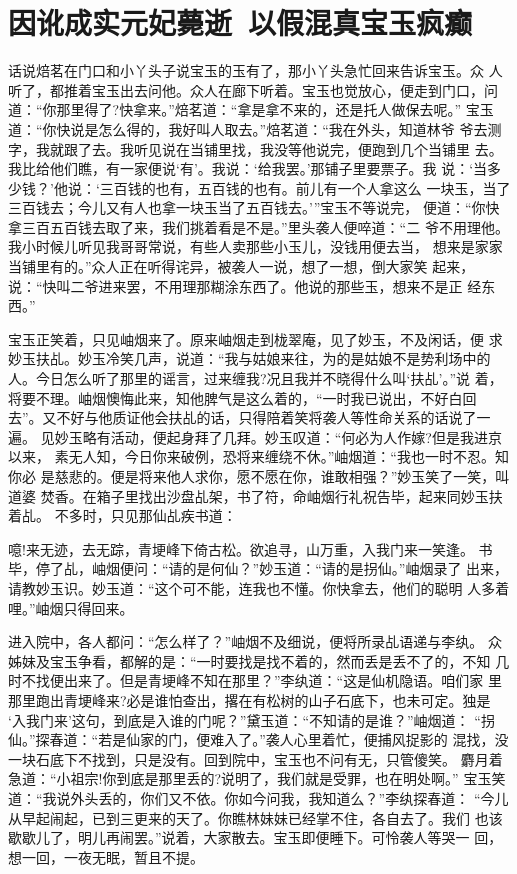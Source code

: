 \chapter{因讹成实元妃薨逝~以假混真宝玉疯癫}

话说焙茗在门口和小丫头子说宝玉的玉有了，那小丫头急忙回来告诉宝玉。众
人听了，都推着宝玉出去问他。众人在廊下听着。宝玉也觉放心，便走到门口，问
道：“你那里得了?快拿来。”焙茗道：“拿是拿不来的，还是托人做保去呢。”
宝玉道：“你快说是怎么得的，我好叫人取去。”焙茗道：“我在外头，知道林爷
爷去测字，我就跟了去。我听见说在当铺里找，我没等他说完，便跑到几个当铺里
去。我比给他们瞧，有一家便说‘有’。我说：‘给我罢。’那铺子里要票子。我
说：‘当多少钱？’他说：‘三百钱的也有，五百钱的也有。前儿有一个人拿这么
一块玉，当了三百钱去；今儿又有人也拿一块玉当了五百钱去。’”宝玉不等说完，
便道：“你快拿三百五百钱去取了来，我们挑着看是不是。”里头袭人便啐道：“二
爷不用理他。我小时候儿听见我哥哥常说，有些人卖那些小玉儿，没钱用便去当，
想来是家家当铺里有的。”众人正在听得诧异，被袭人一说，想了一想，倒大家笑
起来，说：“快叫二爷进来罢，不用理那糊涂东西了。他说的那些玉，想来不是正
经东西。”

宝玉正笑着，只见岫烟来了。原来岫烟走到栊翠庵，见了妙玉，不及闲话，便
求妙玉扶乩。妙玉冷笑几声，说道：“我与姑娘来往，为的是姑娘不是势利场中的
人。今日怎么听了那里的谣言，过来缠我?况且我并不晓得什么叫‘扶乩’。”说
着，将要不理。岫烟懊悔此来，知他脾气是这么着的，“一时我已说出，不好白回
去”。又不好与他质证他会扶乩的话，只得陪着笑将袭人等性命关系的话说了一遍。
见妙玉略有活动，便起身拜了几拜。妙玉叹道：“何必为人作嫁?但是我进京以来，
素无人知，今日你来破例，恐将来缠绕不休。”岫烟道：“我也一时不忍。知你必
是慈悲的。便是将来他人求你，愿不愿在你，谁敢相强？”妙玉笑了一笑，叫道婆
焚香。在箱子里找出沙盘乩架，书了符，命岫烟行礼祝告毕，起来同妙玉扶着乩。
不多时，只见那仙乩疾书道：

噫!来无迹，去无踪，青埂峰下倚古松。欲追寻，山万重，入我门来一笑逢。
书毕，停了乩，岫烟便问：“请的是何仙？”妙玉道：“请的是拐仙。”岫烟录了
出来，请教妙玉识。妙玉道：“这个可不能，连我也不懂。你快拿去，他们的聪明
人多着哩。”岫烟只得回来。

进入院中，各人都问：“怎么样了？”岫烟不及细说，便将所录乩语递与李纨。
众姊妹及宝玉争看，都解的是：“一时要找是找不着的，然而丢是丢不了的，不知
几时不找便出来了。但是青埂峰不知在那里？”李纨道：“这是仙机隐语。咱们家
里那里跑出青埂峰来?必是谁怕查出，撂在有松树的山子石底下，也未可定。独是
‘入我门来’这句，到底是入谁的门呢？”黛玉道：“不知请的是谁？”岫烟道：
“拐仙。”探春道：“若是仙家的门，便难入了。”袭人心里着忙，便捕风捉影的
混找，没一块石底下不找到，只是没有。回到院中，宝玉也不问有无，只管傻笑。
麝月着急道：“小祖宗!你到底是那里丢的?说明了，我们就是受罪，也在明处啊。”
宝玉笑道：“我说外头丢的，你们又不依。你如今问我，我知道么？”李纨探春道：
“今儿从早起闹起，已到三更来的天了。你瞧林妹妹已经掌不住，各自去了。我们
也该歇歇儿了，明儿再闹罢。”说着，大家散去。宝玉即便睡下。可怜袭人等哭一
回，想一回，一夜无眠，暂且不提。

